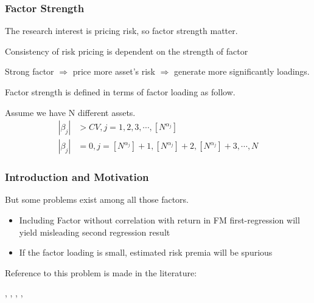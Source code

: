 \documentclass[12pt]{beamer}
\begin{document}
\begin{frame}
	\frametitle{Factor Strength}
	The research interest is pricing risk, so factor strength matter.

	Consistency of risk pricing is dependent on the strength of factor \cite{Pesaran2019}
	


	Strong factor $\Rightarrow$ price more asset's risk $\Rightarrow$ generate more significantly loadings.
	
		Factor strength is defined in terms of factor loading \cite{Bailey2020} as follow.

	 Assume we have N different assets.
	\begin{align*}
	|\beta_j| &> CV , j = 1, 2, 3, \cdots, [N^{\alpha_j}]\\
	|\beta_j |&= 0, j = [N^{\alpha_j} ]+1 ,[N^{\alpha_j}]  +2, [N^{\alpha_j}] +3, \cdots, N
	\end{align*}
\end{frame}
\begin{frame}
\frametitle{Introduction and Motivation}
But some problems exist among all those factors.\\


\begin{itemize}
\item Including Factor without correlation with return in FM first-regression\cite{Fama1973} will yield misleading second regression result \cite{Kan1999}
\item If the factor loading is small, estimated risk premia will be spurious 
\end{itemize}

Reference to this problem is made in the literature:

, , , , 

\end{frame}


\end{document}
